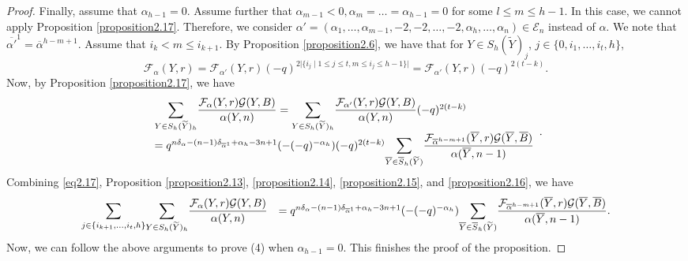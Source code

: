 \documentclass[11pt,oneside]{amsart}
\theoremstyle{plain}
\theoremstyle{definition}
\theoremstyle{remark}
\newcommand{\CE}{{\mathcal E}}
\newcommand{\CF}{{\mathcal F}}
\newcommand{\CG}{{\mathcal G}}
\numberwithin{equation}{section}
\begin{document}
\begin{proof}
		Finally, assume that $\alpha_{h-1}=0$. Assume further that $\alpha_{m-1}<0, \alpha_{m}=\dots=\alpha_{h-1}=0$ for some $l \leq m \leq h-1$. In this case, we cannot apply Proposition \ref{proposition2.17}. Therefore, we consider $\alpha'=(\alpha_1,\dots,\alpha_{m-1},-2,-2,\dots,-2,\alpha_h,\dots,\alpha_n) \in \CE_n$ instead of $\alpha$. We note that $\overline{\alpha'}^1=\overline{\alpha}^{h-m+1}$. Assume that $i_k <m \leq i_{k+1}$. By Proposition \ref{proposition2.6}, we have that for $Y \in S_h(\widetilde{Y})_j$, $j \in \lbrace 0, i_1,\dots,i_t,h \rbrace$,
		\begin{equation*}
			\CF_{\alpha}(Y,r)=\CF_{\alpha'}(Y,r)(-q)^{2 \vert \lbrace i_j \mid 1 \leq j\leq t, m \leq i_j \leq h-1 \rbrace \vert}=\CF_{\alpha'}(Y,r)(-q)^{2(t-k)}.
		\end{equation*}
		Now, by Proposition \ref{proposition2.17}, we have
		\begin{equation}\label{eq2.23}\begin{array}{l}\mathlarger{\sum}_{Y \in S_h(\widetilde{Y})_{h}}	\dfrac{\CF_{\alpha}(Y,r)\CG(Y,B)}{\alpha(Y,n)}=\mathlarger{\sum}_{Y \in S_h(\widetilde{Y})_{h}}	\dfrac{\CF_{\alpha'}(Y,r)\CG(Y,B)}{\alpha(Y,n)}(-q)^{2(t-k)}
				\\=q^{n\delta_{\alpha}-(n-1)\delta_{\overline{\alpha}^1}+\alpha_h-3n+1}(-(-q)^{-\alpha_h})(-q)^{2(t-k)}\mathlarger{\sum}_{\overline{Y} \in \overline{S}_h(\widetilde{Y})}\dfrac{\CF_{\overline{\alpha}^{h-m+1}}(\overline{Y},r)\CG(\overline{Y},\overline{B})}{\alpha(\overline{Y},n-1)}\end{array}.\end{equation}
		Combining \eqref{eq2.17}, Proposition \ref{proposition2.13}, \ref{proposition2.14}, \ref{proposition2.15}, and \ref{proposition2.16}, we have
		\begin{equation*}\begin{array}{ll}\mathlarger{\sum}_{j \in \lbrace i_{k+1},\dots,i_t,h \rbrace}\mathlarger{\sum}_{Y \in S_h(\widetilde{Y})_{h}}	\dfrac{\CF_{\alpha}(Y,r)\CG(Y,B)}{\alpha(Y,n)}&=q^{n\delta_{\alpha}-(n-1)\delta_{\overline{\alpha}^1}+\alpha_h-3n+1}(-(-q)^{-\alpha_h})\mathlarger{\sum}_{\overline{Y} \in \overline{S}_h(\widetilde{Y})}\dfrac{\CF_{\overline{\alpha}^{h-m+1}}(\overline{Y},r)\CG(\overline{Y},\overline{B})}{\alpha(\overline{Y},n-1)}.
		\end{array}\end{equation*}
		Now, we can follow the above arguments to prove (4) when $\alpha_{h-1}=0$.
		This finishes the proof of the proposition.
	\end{proof}
	
\end{document}
